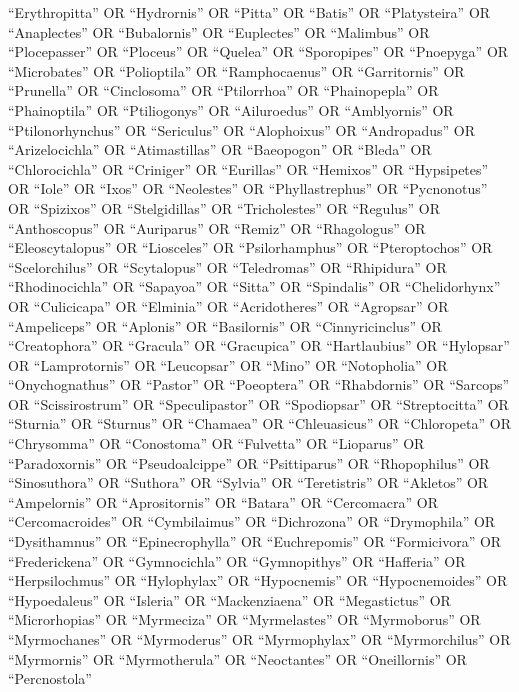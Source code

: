 \documentclass[
  number,
  review,
  onecolumn]{elsarticle}
\begin{document}
``Erythropitta'' OR ``Hydrornis'' OR ``Pitta'' OR ``Batis'' OR
``Platysteira'' OR ``Anaplectes'' OR ``Bubalornis'' OR ``Euplectes'' OR
``Malimbus'' OR ``Plocepasser'' OR ``Ploceus'' OR ``Quelea'' OR
``Sporopipes'' OR ``Pnoepyga'' OR ``Microbates'' OR ``Polioptila'' OR
``Ramphocaenus'' OR ``Garritornis'' OR ``Prunella'' OR ``Cinclosoma'' OR
``Ptilorrhoa'' OR ``Phainopepla'' OR ``Phainoptila'' OR ``Ptiliogonys''
OR ``Ailuroedus'' OR ``Amblyornis'' OR ``Ptilonorhynchus'' OR
``Sericulus'' OR ``Alophoixus'' OR ``Andropadus'' OR ``Arizelocichla''
OR ``Atimastillas'' OR ``Baeopogon'' OR ``Bleda'' OR ``Chlorocichla'' OR
``Criniger'' OR ``Eurillas'' OR ``Hemixos'' OR ``Hypsipetes'' OR
``Iole'' OR ``Ixos'' OR ``Neolestes'' OR ``Phyllastrephus'' OR
``Pycnonotus'' OR ``Spizixos'' OR ``Stelgidillas'' OR ``Tricholestes''
OR ``Regulus'' OR ``Anthoscopus'' OR ``Auriparus'' OR ``Remiz'' OR
``Rhagologus'' OR ``Eleoscytalopus'' OR ``Liosceles'' OR
``Psilorhamphus'' OR ``Pteroptochos'' OR ``Scelorchilus'' OR
``Scytalopus'' OR ``Teledromas'' OR ``Rhipidura'' OR ``Rhodinocichla''
OR ``Sapayoa'' OR ``Sitta'' OR ``Spindalis'' OR ``Chelidorhynx'' OR
``Culicicapa'' OR ``Elminia'' OR ``Acridotheres'' OR ``Agropsar'' OR
``Ampeliceps'' OR ``Aplonis'' OR ``Basilornis'' OR ``Cinnyricinclus'' OR
``Creatophora'' OR ``Gracula'' OR ``Gracupica'' OR ``Hartlaubius'' OR
``Hylopsar'' OR ``Lamprotornis'' OR ``Leucopsar'' OR ``Mino'' OR
``Notopholia'' OR ``Onychognathus'' OR ``Pastor'' OR ``Poeoptera'' OR
``Rhabdornis'' OR ``Sarcops'' OR ``Scissirostrum'' OR ``Speculipastor''
OR ``Spodiopsar'' OR ``Streptocitta'' OR ``Sturnia'' OR ``Sturnus'' OR
``Chamaea'' OR ``Chleuasicus'' OR ``Chloropeta'' OR ``Chrysomma'' OR
``Conostoma'' OR ``Fulvetta'' OR ``Lioparus'' OR ``Paradoxornis'' OR
``Pseudoalcippe'' OR ``Psittiparus'' OR ``Rhopophilus'' OR
``Sinosuthora'' OR ``Suthora'' OR ``Sylvia'' OR ``Teretistris'' OR
``Akletos'' OR ``Ampelornis'' OR ``Aprositornis'' OR ``Batara'' OR
``Cercomacra'' OR ``Cercomacroides'' OR ``Cymbilaimus'' OR
``Dichrozona'' OR ``Drymophila'' OR ``Dysithamnus'' OR
``Epinecrophylla'' OR ``Euchrepomis'' OR ``Formicivora'' OR
``Frederickena'' OR ``Gymnocichla'' OR ``Gymnopithys'' OR ``Hafferia''
OR ``Herpsilochmus'' OR ``Hylophylax'' OR ``Hypocnemis'' OR
``Hypocnemoides'' OR ``Hypoedaleus'' OR ``Isleria'' OR ``Mackenziaena''
OR ``Megastictus'' OR ``Microrhopias'' OR ``Myrmeciza'' OR
``Myrmelastes'' OR ``Myrmoborus'' OR ``Myrmochanes'' OR ``Myrmoderus''
OR ``Myrmophylax'' OR ``Myrmorchilus'' OR ``Myrmornis'' OR
``Myrmotherula'' OR ``Neoctantes'' OR ``Oneillornis'' OR ``Percnostola''
\end{document}

